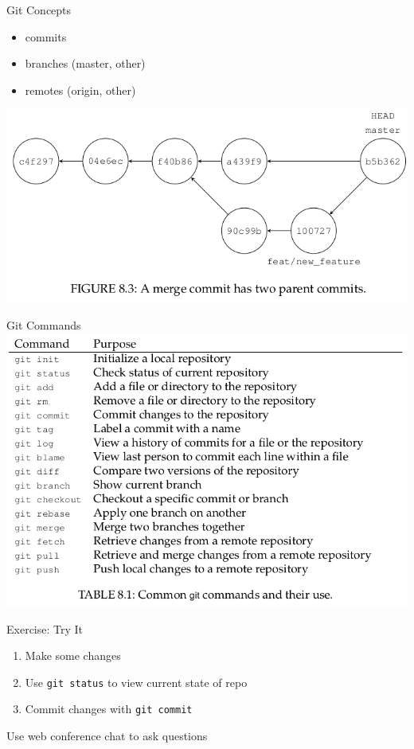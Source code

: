 \documentclass{beamer}
\begin{document}
\begin{frame}[fragile]{Git Concepts}

\begin{itemize}
\item commits
\item branches (master, other)
\item remotes (origin, other)
\end{itemize}

\includegraphics[width=.8\linewidth]{images/git_branches}
\end{frame}

\begin{frame}[fragile]{Git Commands}
\includegraphics[width=\linewidth]{images/git_commands}
\end{frame}



\begin{frame}[fragile]{Exercise: Try It}

\begin{enumerate}
\item Make some changes
\item Use \lstinline|git status| to view current state of repo
\item Commit changes with \lstinline|git commit|
\end{enumerate}

\alert{Use web conference chat to ask questions}
\end{frame}
\end{document}
